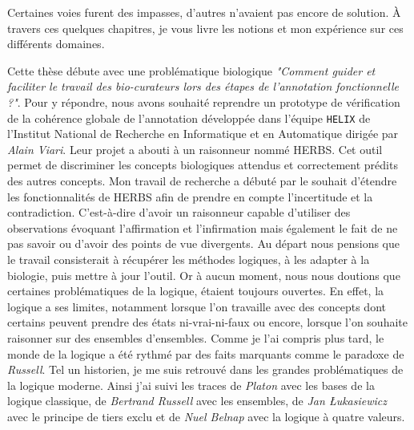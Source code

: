 \begin{refsegment}
Certaines voies furent des impasses, d'autres n'avaient pas encore de solution. À travers ces quelques chapitres, je vous livre les notions et mon expérience sur ces différents domaines.

Cette thèse débute avec une problématique biologique \textit{"Comment guider et faciliter le travail des bio-curateurs lors des étapes de l'annotation fonctionnelle ?"}. Pour y répondre, nous avons souhaité reprendre un prototype de vérification de la cohérence globale de l'annotation développée dans l'équipe \texttt{HELIX} de l'Institut National de Recherche en Informatique et en Automatique dirigée par \textit{Alain Viari}. Leur projet a abouti à un raisonneur nommé \gls{HERBS}. Cet outil permet de discriminer les concepts biologiques attendus et correctement prédits des autres concepts. Mon travail de recherche a débuté par le souhait d'étendre les fonctionnalités de \gls{HERBS} afin de prendre en compte l'incertitude et la contradiction. C'est-à-dire d'avoir un raisonneur capable d'utiliser des observations évoquant l'affirmation et l'infirmation mais également le fait de ne pas savoir ou d'avoir des points de vue divergents. Au départ nous pensions que le travail consisterait à récupérer les méthodes logiques, à les adapter à la biologie, puis mettre à jour l'outil. Or à aucun moment, nous nous doutions que certaines problématiques de la logique, étaient toujours ouvertes. En effet, la logique a ses limites, notamment lorsque l'on travaille avec des concepts dont certains peuvent prendre des états ni-vrai-ni-faux ou encore, lorsque l'on souhaite raisonner sur des ensembles d'ensembles. Comme je l'ai compris plus tard, le monde de la logique a été rythmé par des faits marquants comme le paradoxe de \textit{Russell}. Tel un historien, je me suis retrouvé dans les grandes problématiques de la logique moderne. Ainsi j'ai suivi les traces de \textit{Platon} avec les bases de la logique classique, de \textit{Bertrand Russell} avec les ensembles, de \textit{Jan Łukasiewicz} avec le principe de tiers exclu et de \textit{Nuel Belnap} avec la logique à quatre valeurs.

\end{refsegment}
